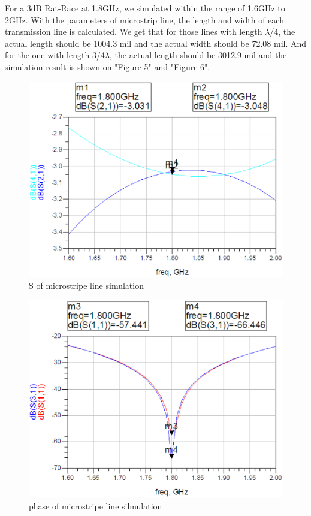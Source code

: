 \documentclass[11pt,a4paper]{report}
\begin{document}
For a 3dB Rat-Race at 1.8GHz, we simulated within the range of 1.6GHz to 2GHz. With the parameters of microstrip line, the length and width of each transmission line is calculated. We get that for those lines with length \(\lambda\)/4, the actual length should be 1004.3 mil and the actual width should be 72.08 mil. And for the one with length 3/4\(\lambda\), the actual length should be 3012.9 mil and the simulation result is shown on "Figure 5" and "Figure 6". \\

\begin{figure}
\centering
\includegraphics[width=\textwidth]{simul1.eps}
\caption{S of microstripe line simulation}
\end{figure}

\begin{figure}
\centering
\includegraphics[width=\textwidth]{simul2.eps}
\caption{phase of microstripe line silmulation}
\end{figure}
\end{document}
